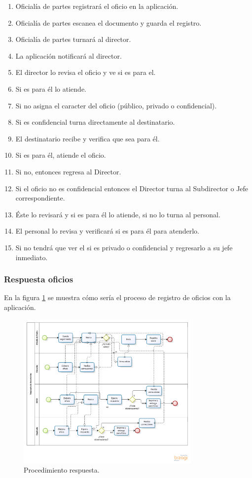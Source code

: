 \begin{enumerate}
	\item Oficialía de partes registrará el oficio en la aplicación.
	\item Oficialía de partes escanea el documento y guarda el registro. 
	\item Oficialía de partes turnará al director.
	\item La aplicación notificará al director.
	\item El director lo revisa el oficio y ve si es para el.
	\item Si es para él lo atiende.
	\item Si no asigna el caracter del oficio (público, privado o confidencial).
	\item Si es confidencial turna directamente al destinatario. 
	\item El destinatario recibe y verifica que sea para él.
	\item Si es para él, atiende el oficio.
	\item Si no, entonces regresa al Director.
	\item Si el oficio no es confidencial entonces el Director turna al Subdirector o Jefe correspondiente.
	\item Éste lo revisará y si es para él lo atiende, si no lo turna al personal.
	\item El personal lo revisa y verificará si es para él para atenderlo.
	\item Si no tendrá que ver el si es privado o confidencial y regresarlo a su jefe inmediato.
\end{enumerate}

\subsubsection{Respuesta oficios}

En la figura \ref{Respuesta oficio} se muestra cómo sería el proceso de registro de oficios con la aplicación.

\begin{figure}[htbp!]
	\centering 
		\includegraphics[width=0.8\textwidth]{images/propuesta/procesorespuesta}
	\caption{Procedimiento respuesta.}
	\label{Respuesta oficio}
\end{figure}

